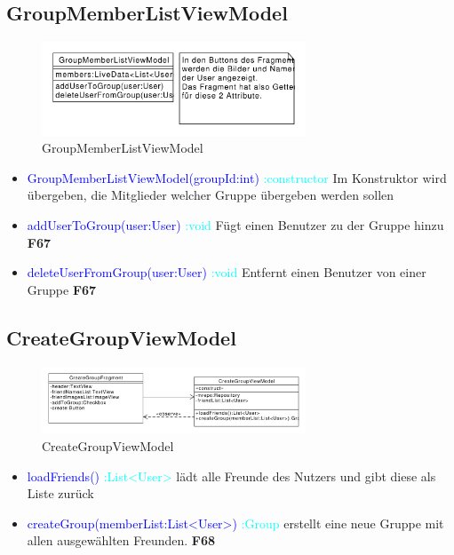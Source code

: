 \subsection{GroupMemberListViewModel}
\begin{figure}[H]
	\centering
	\includegraphics[width=0.7\textwidth]{pics/viewModel/Group_Member_List_ViewModel.pdf}%
	\caption{GroupMemberListViewModel}%
	\label{viewModel}%
\end{figure}
\begin{itemize}
	\item \textcolor{blue}{GroupMemberListViewModel(groupId:int)} \textcolor{cyan}{:constructor} Im Konstruktor wird übergeben, die Mitglieder welcher Gruppe übergeben werden sollen
	\item \textcolor{blue}{addUserToGroup(user:User)} \textcolor{cyan}{:void} Fügt einen Benutzer zu der Gruppe hinzu \textbf{F67}
	\item \textcolor{blue}{deleteUserFromGroup(user:User)} \textcolor{cyan}{:void} Entfernt einen Benutzer von einer Gruppe \textbf{F67}
\end{itemize}


\subsection{CreateGroupViewModel}
\begin{figure}[H]
	\centering
	\includegraphics[width=0.7\textwidth]{pics/viewModel/Create_Group_ViewModel.pdf}%
	\caption{CreateGroupViewModel}%
	\label{viewModel}%
\end{figure}
\begin{itemize}
	\item \textcolor{blue}{loadFriends()} \textcolor{cyan}{:List<User>}
	lädt alle Freunde des Nutzers und gibt diese als Liste zurück
	\item \textcolor{blue}{createGroup(memberList:List<User>)} \textcolor{cyan}{:Group} erstellt eine neue Gruppe mit allen ausgewählten Freunden. \textbf{F68}
\end{itemize}

